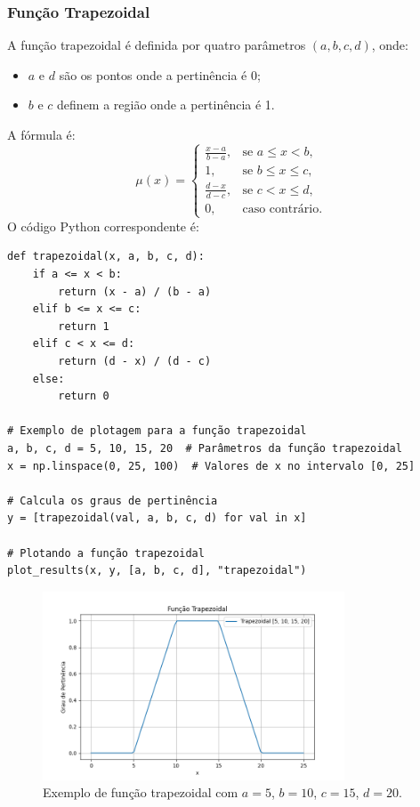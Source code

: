 \documentclass[a4paper,12pt]{article}
\begin{document}
\subsubsection{Função Trapezoidal}
A função trapezoidal é definida por quatro parâmetros $(a, b, c, d)$, onde:
\begin{itemize}
    \item $a$ e $d$ são os pontos onde a pertinência é 0;
    \item $b$ e $c$ definem a região onde a pertinência é 1.
\end{itemize}
A fórmula é:
\[
\mu(x) =
\begin{cases}
\frac{x - a}{b - a}, & \text{se } a \leq x < b, \\
1, & \text{se } b \leq x \leq c, \\
\frac{d - x}{d - c}, & \text{se } c < x \leq d, \\
0, & \text{caso contrário.}
\end{cases}
\]
O código Python correspondente é:
\begin{verbatim}
def trapezoidal(x, a, b, c, d):
    if a <= x < b:
        return (x - a) / (b - a)
    elif b <= x <= c:
        return 1
    elif c < x <= d:
        return (d - x) / (d - c)
    else:
        return 0

# Exemplo de plotagem para a função trapezoidal
a, b, c, d = 5, 10, 15, 20  # Parâmetros da função trapezoidal
x = np.linspace(0, 25, 100)  # Valores de x no intervalo [0, 25]

# Calcula os graus de pertinência
y = [trapezoidal(val, a, b, c, d) for val in x]

# Plotando a função trapezoidal
plot_results(x, y, [a, b, c, d], "trapezoidal")

\end{verbatim}
\begin{figure}[H]
    \centering
    \includegraphics[width=0.8\textwidth]{img/trapezoidal.png}
    \caption{Exemplo de função trapezoidal com $a=5$, $b=10$, $c=15$, $d=20$.}
\end{figure}
\end{document}
